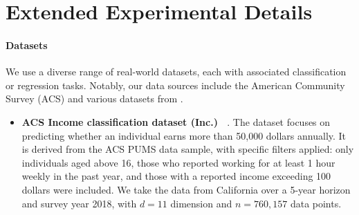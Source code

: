 \section{Extended Experimental Details}
\label{appendix:datasets}
\paragraph{Datasets}
We use a diverse range of real-world datasets, each with associated classification or regression tasks. Notably, our data sources include the American Community Survey (ACS) and various datasets from \cite{grinsztajn2022tree}. 

\begin{itemize}
    \item \textbf{ACS Income classification dataset (Inc.) ~\citep{ding2021retiring}}. The dataset focuses on predicting whether an individual earns more than 50,000 dollars annually. It is derived from the ACS PUMS data sample, with specific filters applied: only individuals aged above 16, those who reported working for at least 1 hour weekly in the past year, and those with a reported income exceeding 100 dollars were included. We take the data from California over a 5-year horizon and survey year 2018, with $d=11$ dimension and $n=760,157$ data points.


\end{itemize}

